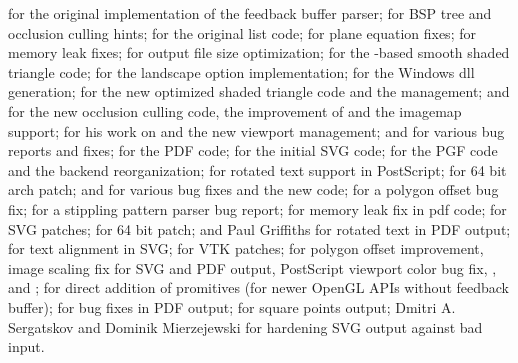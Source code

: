  for the original implementation of
the feedback buffer parser;
%
 for BSP tree and occlusion
culling hints;
%
 for the original list
code;
%
 for plane equation
fixes;
%
 for memory leak fixes;
%
 for output file size optimization;
%
 for the -based smooth shaded
triangle code;
%
 for the landscape option
implementation;
%
 for the Windows dll generation;
%
 for the new optimized
shaded triangle code and the  management;
%
 and  for the new occlusion culling code, the
improvement of  and the imagemap support;
%
 for his work on
 and the new viewport management;
%
 and  for various bug reports and fixes;
%
 for the PDF code;
%
 for the initial SVG code;
%
 for the PGF code and the
backend reorganization;
%
 for rotated text support in
PostScript;
%
 for 64 bit arch patch;
%
 and  for various bug fixes and the new
 code;
%
 for a polygon offset bug
fix;
%
 for a
stippling pattern parser bug report;
%
 for memory leak fix
in pdf code;
%
 for SVG patches;
%
 for 64 bit patch;
%
 and Paul Griffiths for
rotated text in PDF output;
%
 for text alignment in SVG;
%
 for VTK patches;
%
 for polygon offset
improvement, image scaling fix for SVG and PDF output, PostScript viewport color
bug fix, ,  and  ;
%
 for direct addition of promitives
(for newer OpenGL APIs without feedback buffer);
%
 for bug fixes in PDF output;
%
 for square points output;
%
Dmitri A. Sergatskov and Dominik Mierzejewski for hardening SVG output against
bad input.

